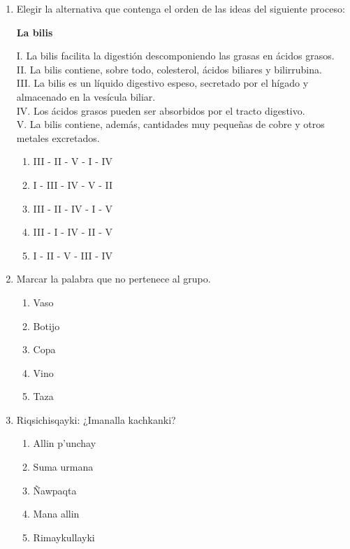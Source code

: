 \begin{enumerate}
	\begin{enumerate}[label=\alph*)]
		\item O
		\item P
		\item T
		\item R
		\item M
	\end{enumerate}
	
	\item Elegir la alternativa que contenga el orden de las ideas del siguiente proceso:
	
	\textbf{La bilis}
	
	I. La bilis facilita la digestión descomponiendo las grasas en ácidos grasos.\\
	II. La bilis contiene, sobre todo, colesterol, ácidos biliares y bilirrubina.\\
	III. La bilis es un líquido digestivo espeso, secretado por el hígado y almacenado en la vesícula biliar.\\
	IV. Los ácidos grasos pueden ser absorbidos por el tracto digestivo.\\
	V. La bilis contiene, además, cantidades muy pequeñas de cobre y otros metales excretados.
	
	\begin{enumerate}[label=\alph*)]
		\item III - II - V - I - IV
		\item I - III - IV - V - II
		\item III - II - IV - I - V
		\item III - I - IV - II - V
		\item I - II - V - III - IV
	\end{enumerate}
	
	\item Marcar la palabra que no pertenece al grupo.
	\begin{enumerate}[label=\alph*)]
		\item Vaso
		\item Botijo
		\item Copa
		\item Vino
		\item Taza
	\end{enumerate}
	
	\item Riqsichisqayki: ¿Imanalla kachkanki?
	\begin{enumerate}[label=\alph*)]
		\item Allin p’unchay
		\item Suma urmana
		\item Ñawpaqta
		\item Mana allin
		\item Rimaykullayki
	\end{enumerate}
	

\end{enumerate}
